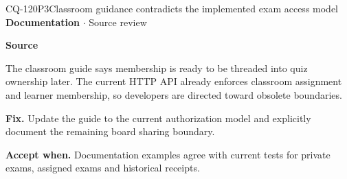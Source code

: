 \begin{finding}{CQ-120}{P3}{Classroom guidance contradicts the implemented exam access model}
\textbf{Documentation} $\cdot$ Source review\par
\textbf{Source}\quad{}\par
The classroom guide says membership is ready to be threaded into quiz ownership later. The current HTTP API already enforces classroom assignment and learner membership, so developers are directed toward obsolete boundaries.\par
\textbf{Fix.} Update the guide to the current authorization model and explicitly document the remaining board sharing boundary.\par
\textbf{Accept when.} Documentation examples agree with current tests for private exams, assigned exams and historical receipts.
\end{finding}
